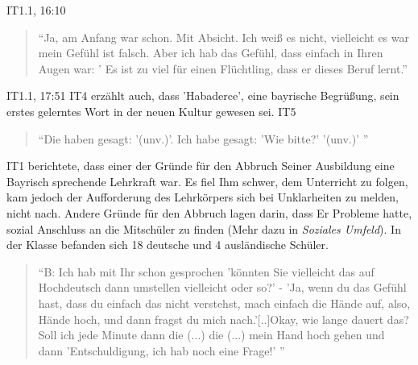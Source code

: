 IT1.1, 16:10
\begin{quote}
    ``Ja, am Anfang war schon. Mit Absicht. Ich weiß es nicht, vielleicht es war mein Gefühl ist falsch. Aber ich hab das Gefühl, dass einfach in Ihren Augen war: ' Es ist zu viel für einen Flüchtling, dass er dieses Beruf lernt.''
\end{quote}
IT1.1, 17:51
IT4 erzählt auch, dass 'Habaderce', eine bayrische Begrüßung, sein erstes gelerntes Wort in der neuen Kultur gewesen sei.
IT5 
\begin{quote}
    ``Die haben gesagt: '(unv.)'. Ich habe gesagt: 'Wie bitte?' '(unv.)' ''
\end{quote}
IT1 berichtete, dass einer der Gründe für den Abbruch Seiner Ausbildung eine Bayrisch sprechende Lehrkraft war. Es fiel Ihm schwer, dem Unterricht zu folgen, kam jedoch der Aufforderung des Lehrkörpers sich bei Unklarheiten zu melden, nicht nach. Andere Gründe für den Abbruch lagen darin, dass Er Probleme hatte, sozial Anschluss an die Mitschüler zu finden (Mehr dazu in \textit{Soziales Umfeld}). 
In der Klasse befanden sich 18 deutsche und 4 ausländische Schüler.

\begin{quote}
    ``B: Ich hab mit Ihr schon gesprochen 'könnten Sie vielleicht das auf Hochdeutsch dann umstellen vielleicht oder so?' - 'Ja, wenn du das Gefühl hast, dass du einfach das nicht verstehst, mach einfach die Hände auf, also, Hände hoch, und dann fragst du mich nach.'[..]Okay, wie lange dauert das? Soll ich jede Minute dann die (...) die (...) mein Hand hoch gehen und dann 'Entschuldigung, ich hab noch eine Frage!' ''
\end{quote}